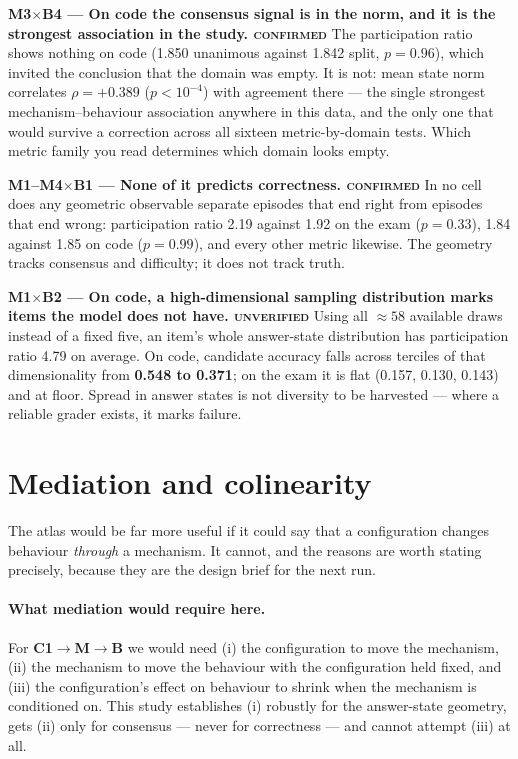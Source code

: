 \documentclass[10pt,a4paper]{article}
\newcommand{\ax}[1]{\textcolor{accent}{\textbf{#1}}}
\newcommand{\bx}[1]{\textcolor{warm}{\textbf{#1}}}
\newcommand{\mx}[1]{\textbf{#1}}
\newcommand{\trend}[1]{\medskip\noindent\textbf{#1}\quad}
\begin{document}
\trend{\mx{M3}$\times$\bx{B4} --- On code the consensus signal is in the norm, and it is the strongest association in the study. \textsc{confirmed}}
The participation ratio shows nothing on code (1.850 unanimous against 1.842 split, $p=0.96$), which invited the conclusion that the domain was empty. It is not: mean state norm correlates $\rho=+0.389$ ($p<10^{-4}$) with agreement there --- the single strongest mechanism--behaviour association anywhere in this data, and the only one that would survive a correction across all sixteen metric-by-domain tests. Which metric family you read determines which domain looks empty.

\trend{\mx{M1}--\mx{M4}$\times$\bx{B1} --- None of it predicts correctness. \textsc{confirmed}}
In no cell does any geometric observable separate episodes that end right from episodes that end wrong: participation ratio 2.19 against 1.92 on the exam ($p=0.33$), 1.84 against 1.85 on code ($p=0.99$), and every other metric likewise. The geometry tracks consensus and difficulty; it does not track truth.

\trend{\mx{M1}$\times$\bx{B2} --- On code, a high-dimensional sampling distribution marks items the model does not have. \textsc{unverified}}
Using all $\approx58$ available draws instead of a fixed five, an item's whole answer-state distribution has participation ratio 4.79 on average. On code, candidate accuracy falls across terciles of that dimensionality from \textbf{0.548 to 0.371}; on the exam it is flat (0.157, 0.130, 0.143) and at floor. Spread in answer states is not diversity to be harvested --- where a reliable grader exists, it marks failure.

\section{Mediation and colinearity}\label{sec:med}

The atlas would be far more useful if it could say that a configuration changes behaviour \emph{through} a mechanism. It cannot, and the reasons are worth stating precisely, because they are the design brief for the next run.

\paragraph{What mediation would require here.} For \ax{C1}$\to$\mx{M}$\to$\bx{B} we would need (i) the configuration to move the mechanism, (ii) the mechanism to move the behaviour with the configuration held fixed, and (iii) the configuration's effect on behaviour to shrink when the mechanism is conditioned on. This study establishes (i) robustly for the answer-state geometry, gets (ii) only for consensus --- never for correctness --- and cannot attempt (iii) at all.
\end{document}
